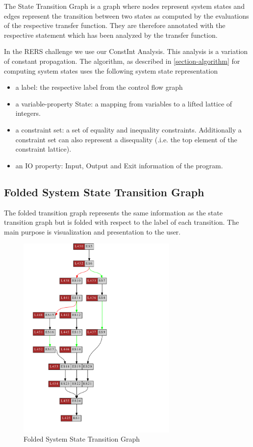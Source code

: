 The State Transition Graph is a graph where nodes represent system states
and edges represent the transition between two states as computed by
the evaluations of the respective transfer function. They are
therefore annotated with the respective statement which has been
analyzed by the transfer function.

In the RERS challenge we use our ConstInt Analysis. This analysis is a
variation of constant propagation. The algorithm, as described in
\ref{section-algorithm} for computing system states uses the
following system state representation

\begin{itemize}
  \item a label: the respective label from the control flow graph
  \item a variable-property State: a mapping from variables to a
    lifted lattice of integers.
  \item a constraint set: a set of equality and inequality
    constraints. Additionally a constraint set can also represent a
    disequality (.i.e. the top element of the constraint lattice).
  \item an IO property: Input, Output and Exit information of the
    program. 
 \end{itemize}

\subsection{Folded System State Transition Graph}

The folded transition graph represents the same information as the state transition graph but is folded with respect to the label of each transition. The main purpose is visualization and presentation to the user.

\begin{figure}[t]
\centering
\includegraphics[width=0.7\textwidth]{gfx/basictest15_transitiongraph2.pdf}
\caption{Folded System State Transition Graph}
\end{figure}

